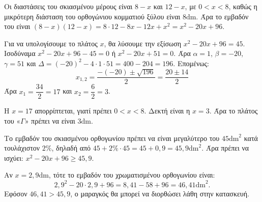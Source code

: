 
\begin{alist}
\item Οι διαστάσεις του σκιασμένου μέρους είναι $8 - x$ και $12 - x$, με $0 < x < 8$, καθώς η μικρότερη διάσταση του ορθογώνιου κομματιού ξύλου είναι $8\text{dm}$.
Άρα το εμβαδόν του είναι $(8 - x)(12 - x) = 8 \cdot 12 - 8x - 12x + x^2 = x^2 - 20x + 96$.

\item
\begin{rlist}
\item Για να υπολογίσουμε το πλάτος $x$, θα λύσουμε την εξίσωση $x^2 - 20x + 96 = 45$.
Ισοδύναμα $x^2 - 20x + 96 - 45 = 0$ ή $x^2 - 20x + 51 = 0$.
Άρα $\alpha = 1$, $\beta = -20$, $\gamma = 51$ και $\Delta = (-20)^2 - 4 \cdot 1 \cdot 51 = 400 - 204 = 196$.
Επομένως:
\[x_{1,2} = \dfrac{-(-20) \pm \sqrt{196}}{2} = \dfrac{20 \pm 14}{2}\]
Άρα $x_1 = \dfrac{34}{2} = 17$ και $x_2 = \dfrac{6}{2} = 3$.

Η $x = 17$ απορρίπτεται, γιατί πρέπει $0 < x < 8$.
Δεκτή είναι η $x = 3$.
Άρα το πλάτος του «$\Gamma$» πρέπει να είναι $3\text{dm}$.

\item Το εμβαδόν του σκιασμένου ορθογωνίου πρέπει να είναι μεγαλύτερο του $45\text{dm}^2$ κατά τουλάχιστον $2\%$, δηλαδή από $45 + 2\% \cdot 45 = 45 + 0,9 = 45,9\text{dm}^2$.
Άρα πρέπει να ισχύει: $x^2 - 20x + 96 \ge 45,9$.

\item Αν $x = 2,9\text{dm}$, τότε το εμβαδόν του χρωματισμένου ορθογωνίου είναι:
\[2,9^2 - 20 \cdot 2,9 + 96 = 8,41 - 58 + 96 = 46,41\text{dm}^2.\]
Εφόσον $46,41 > 45,9$, ο μαραγκός θα μπορεί να διορθώσει λάθη στην κατασκευή.
\end{rlist}
\end{alist}

